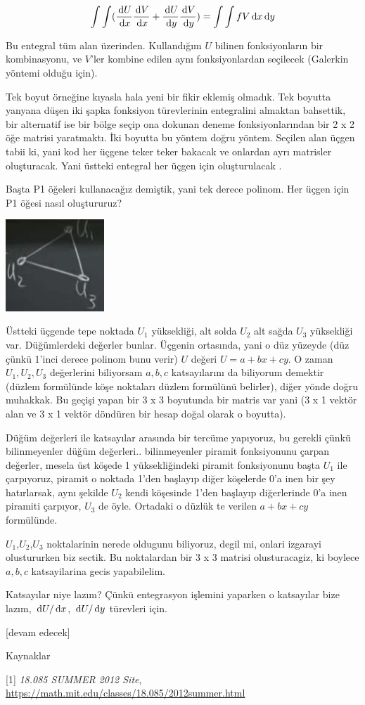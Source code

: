 \documentclass[12pt,fleqn]{article}\usepackage{../../common}
\begin{document}
$$
\int \int
(
\frac{\,\mathrm{d} U}{\,\mathrm{d} x} \frac{\,\mathrm{d} V}{\,\mathrm{d} x} +
\frac{\,\mathrm{d} U}{\,\mathrm{d} y} \frac{\,\mathrm{d} V}{\,\mathrm{d} y} 
) =
\int \int f V  \,\mathrm{d} x \,\mathrm{d} y
$$

Bu entegral tüm alan üzerinden. Kullandığım $U$ bilinen fonksiyonların bir
kombinasyonu, ve $V$'ler kombine edilen aynı fonksiyonlardan seçilecek (Galerkin
yöntemi olduğu için). 

Tek boyut örneğine kıyasla hala yeni bir fikir eklemiş olmadık. Tek boyutta
yanyana düşen iki şapka fonksiyon türevlerinin entegralini almaktan bahsettik,
bir alternatif ise bir bölge seçip ona dokunan deneme fonksiyonlarından bir 2 x
2 öğe matrisi yaratmaktı. İki boyutta bu yöntem doğru yöntem. Seçilen alan üçgen
tabii ki, yani kod her üçgene teker teker bakacak ve onlardan ayrı matrisler
oluşturacak. Yani üstteki entegral her üçgen için oluşturulacak .

Başta P1 öğeleri kullanacağız demiştik, yani tek derece polinom. Her üçgen
için P1 öğesi nasıl oluştururuz? 

\includegraphics[width=10em]{compscieng_1_27_04.png}

Üstteki üçgende tepe noktada $U_1$ yüksekliği, alt solda $U_2$ alt sağda $U_3$
yüksekliği var. Düğümlerdeki değerler bunlar. Üçgenin ortasında, yani o düz
yüzeyde (düz çünkü 1'inci derece polinom bunu verir) $U$ değeri $U = a+bx+cy$.
O zaman $U_1,U_2,U_3$ değerlerini biliyorsam $a,b,c$ katsayılarını da biliyorum
demektir (düzlem formülünde köşe noktaları düzlem formülünü belirler), diğer
yönde doğru muhakkak. Bu geçişi yapan bir 3 x 3 boyutunda bir matris var yani (3
x 1 vektör alan ve 3 x 1 vektör döndüren bir hesap doğal olarak o boyutta).

Düğüm değerleri ile katsayılar arasında bir tercüme yapıyoruz, bu gerekli çünkü
bilinmeyenler düğüm değerleri.. bilinmeyenler piramit fonksiyonunu çarpan
değerler, mesela üst köşede 1 yüksekliğindeki piramit fonksiyonunu başta $U_1$
ile çarpıyoruz, piramit o noktada 1'den başlayıp diğer köşelerde 0'a inen bir
şey hatırlarsak, aynı şekilde $U_2$ kendi köşesinde 1'den başlayıp diğerlerinde
0'a inen piramiti çarpıyor, $U_3$ de öyle. Ortadaki o düzlük te verilen $a + bx
+ cy$ formülünde.

$U_1$,$U_2$,$U_3$ noktalarinin nerede oldugunu biliyoruz, degil mi, onlari
izgarayi olustururken biz sectik. Bu noktalardan bir 3 x 3 matrisi
olusturacagiz, ki boylece $a,b,c$ katsayilarina gecis yapabilelim.

Katsayılar niye lazım? Çünkü entegrasyon işlemini yaparken o katsayılar bize
lazım, $\,\mathrm{d} U / \,\mathrm{d} x$, $\,\mathrm{d} U / \,\mathrm{d} y$ türevleri için. 




[devam edecek]

Kaynaklar

[1] {\em 18.085 SUMMER 2012 Site},
    \url{https://math.mit.edu/classes/18.085/2012summer.html}
\end{document}
